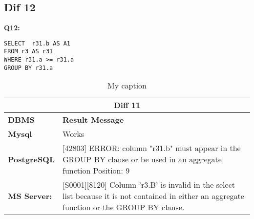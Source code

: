 \subsection{Dif 12}
 
\begin{mdframed}[backgroundcolor=gray!20] 
\textbf{Q12:}
\begin{lstlisting}
SELECT  r31.b AS A1
FROM r3 AS r31
WHERE r31.a >= r31.a
GROUP BY r31.a
\end{lstlisting}
\end{mdframed} 
 
\begin{table}[h]
\centering
\caption{My caption}
\label{my-label}
\begin{tabular}{|p{2cm}|p{12cm}|}
\hline
\multicolumn{2}{|c|}{\textbf{Diff 11}}                                                                                                                                                                                                                                                                                               \\ \hline
\textbf{DBMS}                              & \textbf{Result Message}                                                                                                                                                                                                                                                                 \\ \hline
{\color[HTML]{333333} \textbf{Mysql}}      & {\color[HTML]{333333} Works}                                                                                                                                                                                                                                                            \\ \hline
{\color[HTML]{333333} \textbf{PostgreSQL}} & {\color[HTML]{333333} {[}42803{]} ERROR: column "r31.b" must appear in the GROUP BY clause or be used in an aggregate function Position: 9}                                                                                                                                             \\ \hline
{\color[HTML]{333333} \textbf{MS Server:}} & {\color[HTML]{333333} {[}S0001{]}{[}8120{]} Column 'r3.B' is invalid in the select list because it is not contained in either an aggregate function or the GROUP BY clause.}                                                                                                            \\ \hline

\end{tabular}
\end{table}

